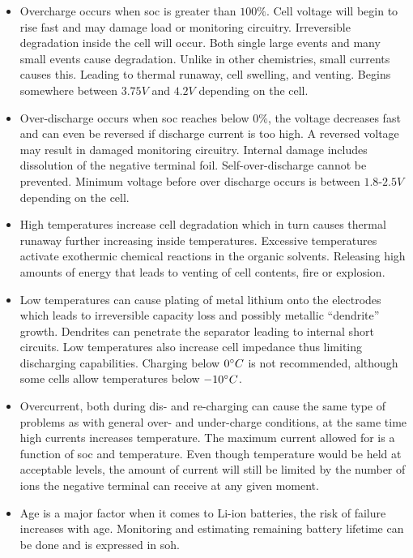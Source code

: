 \begin{itemize}
\item Overcharge occurs when \gls{soc} is greater than $100\%$. Cell voltage will begin to rise fast and may damage load or monitoring circuitry. Irreversible degradation inside the cell will occur. Both single large events and many small events cause degradation. Unlike in other chemistries, small currents causes this. Leading to thermal runaway, cell swelling, and venting. Begins somewhere between $3.75V$ and $4.2V$ depending on the cell.
\item Over-discharge occurs when \gls{soc} reaches below $0\%$, the voltage decreases fast and can even be reversed if discharge current is too high. A reversed voltage may result in damaged monitoring circuitry. Internal damage includes dissolution of the negative terminal foil. Self-over-discharge cannot be prevented. Minimum voltage before over discharge occurs is between $1.8$-$2.5V$ depending on the cell.
\item High temperatures increase cell degradation which in turn causes thermal runaway further increasing inside temperatures. Excessive temperatures activate exothermic chemical reactions in the organic solvents. Releasing high amounts of energy that leads to venting of cell contents, fire or explosion.
\item Low temperatures can cause plating of metal lithium onto the electrodes which leads to irreversible capacity loss and possibly metallic ``dendrite'' growth. Dendrites can penetrate the separator leading to internal short circuits. Low temperatures also increase cell impedance thus limiting discharging capabilities. Charging below $0\degree C$ is not recommended, although some cells allow temperatures below $-10\degree C$.
\item Overcurrent, both during dis- and re-charging can cause the same type of problems as with general over- and under-charge conditions, at the same time high currents increases temperature. The maximum current allowed for is a function of \gls{soc} and temperature. Even though temperature would be held at acceptable levels, the amount of current will still be limited by the number of ions the negative terminal can receive at any given moment.
\item Age is a major factor when it comes to Li-ion batteries, the risk of failure increases with age. Monitoring and estimating remaining battery lifetime can be done and is expressed in \gls{soh}.
\end{itemize}

